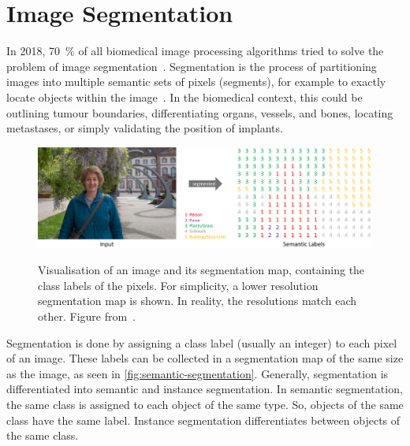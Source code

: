 \section{Image Segmentation}\label{sec:segmentation}

In 2018, 70~\% of all biomedical image processing algorithms tried to solve the problem of image segmentation~\autocite{MaierHein2018}.
Segmentation is the process of partitioning images into multiple semantic sets of pixels (segments), for example to exactly locate objects within the image~\autocite{Szeliski2021}.
In the biomedical context, this could be outlining tumour boundaries, differentiating organs, vessels, and bones, locating metastases, or simply validating the position of implants.

\begin{figure}[!htb]
    \centering
    \includegraphics[width=\textwidth]{pictures/semantic-labels}\\
    \caption[Segmentation Map: Image and Labels]{Visualisation of an image and its segmentation map, containing the class labels of the pixels. For simplicity, a lower resolution segmentation map is shown. In reality, the resolutions match each other. Figure from~\autocite{Jordan2018}.}
    \label{fig:semantic-segmentation}
\end{figure}

Segmentation is done by assigning a class label (usually an integer) to each pixel of an image.
These labels can be collected in a segmentation map of the same size as the image, as seen in \autoref{fig:semantic-segmentation}.
Generally, segmentation is differentiated into semantic and instance segmentation.
In semantic segmentation, the same class is assigned to each object of the same type.
So, objects of the same class have the same label.
Instance segmentation differentiates between objects of the same class.~\autocite{Szeliski2021}

